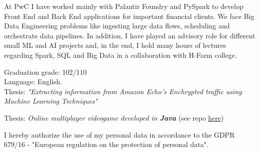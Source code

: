 
At PwC I have worked mainly with Palantir Foundry and PySpark to develop Front End and Back End applications for important financial clients. We face Big Data Engineering problems like ingesting large data flows, scheduling and orchestrate data pipelines.
In addition, I have played an advisory role for different small ML and AI projects and,
in the end, I hold many hours of lectures regarding Spark, SQL and Big Data in a collaboration with H-Farm college.


Graduation grade: 102/110\\
Language: English.\\
Thesis: \textit{"Extracting information from Amazon Echo's Enchrypted traffic using Machine Learning Techniques"}

\divider

Thesis: \textit{Online multiplayer videogame developed in \textbf{Java}} (see repo \href{https://github.com/lentinip/ing-sw-2019-Lentini-Marazzi-Marini}{here})
\divider






\divider

\footnotesize{I hereby authorize the use of my personal data in accordance to the GDPR 679/16 - "European regulation on the protection of personal data".}

